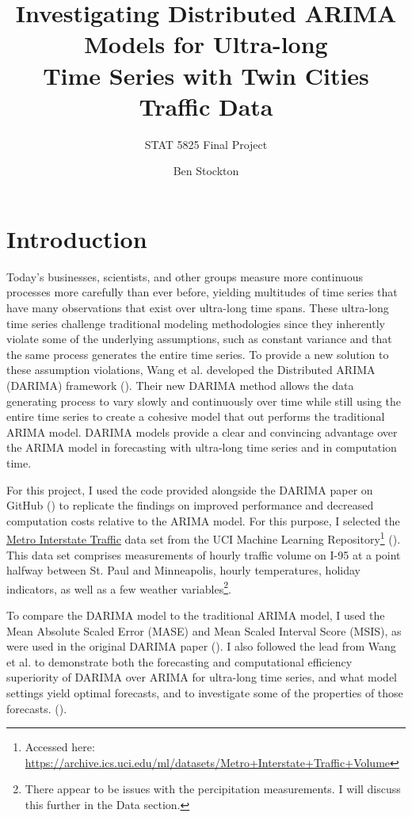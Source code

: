 \documentclass[
]{article}
\title{Investigating Distributed ARIMA Models for Ultra-long \\ Time Series with Twin Cities Traffic Data}
\subtitle{STAT 5825 Final Project}
\author{Ben Stockton}
\begin{document}
\maketitle

\section*{Introduction}

Today's businesses, scientists, and other groups measure more continuous processes more carefully than ever before, yielding multitudes of time series that have many observations that exist over ultra-long time spans. These ultra-long time series challenge traditional modeling methodologies since they inherently violate some of the underlying assumptions, such as constant variance and that the same process generates the entire time series. To provide a new solution to these assumption violations, Wang et al. developed the Distributed ARIMA (DARIMA) framework (\cite*{wang_distributed_2020}). Their new DARIMA method allows the data generating process to vary slowly and continuously over time while still using the entire time series to create a cohesive model that out performs the traditional ARIMA model. DARIMA models provide a clear and convincing advantage over the ARIMA model in forecasting with ultra-long time series and in computation time.

For this project, I used the code provided alongside the DARIMA paper on GitHub (\cite{wang_xqnwang_github_2020}) to replicate the findings on improved performance and decreased computation costs relative to the ARIMA model. For this purpose, I selected the \href{https://archive.ics.uci.edu/ml/datasets/Metro+Interstate+Traffic+Volume}{Metro Interstate Traffic} data set from the UCI Machine Learning Repository\footnote{Accessed here: \href{https://archive.ics.uci.edu/ml/datasets/Metro+Interstate+Traffic+Volume}{https://archive.ics.uci.edu/ml/datasets/Metro+Interstate+Traffic+Volume}} (\cite{hogue_uci_2019}). This data set comprises measurements of hourly traffic volume on I-95 at a point halfway between St. Paul and Minneapolis, hourly temperatures, holiday indicators, as well as a few weather variables\footnote{There appear to be issues with the percipitation measurements. I will discuss this further in the Data section.}. 

To compare the DARIMA model to the traditional ARIMA model, I used the Mean Absolute Scaled Error (MASE) and Mean Scaled Interval Score (MSIS), as were used in the original DARIMA paper (\cite[p.~25]{wang_distributed_2020}). I also followed the lead from Wang et al. to demonstrate both the forecasting and computational efficiency superiority of DARIMA over ARIMA for ultra-long time series, and what model settings yield optimal forecasts, and to investigate some of the properties of those forecasts. (\cite*[p.~21-29]{wang_distributed_2020}).
\end{document}
